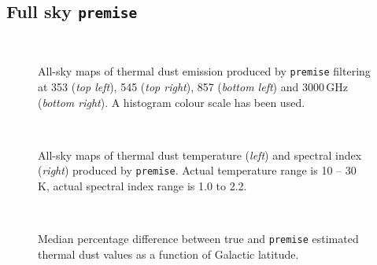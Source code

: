 \documentclass[a4paper,fleqn,usenatbib]{mnras}
\begin{document}
\subsection{Full sky {\texttt{premise}}}

\begin{figure}
\centering
{}
\,
\,
\caption{All-sky maps of thermal dust emission produced by {\texttt{premise}} filtering at 353 ({\it{top left}}), 545 ({\it{top right}}), 857 ({\it{bottom left}}) and 3000\,GHz ({\it{bottom right}}). A histogram colour scale has been used.}
\label{fig:dustmaps}
\end{figure}

\begin{figure}
\centering
{}
\,
\caption{All-sky maps of thermal dust temperature ({\it{left}}) and spectral index ({\it{right}}) produced by {\texttt{premise}}. Actual temperature range is 10 -- 30 K, actual spectral index range is 1.0 to 2.2.}
\label{fig:paramsmaps}
\end{figure}

\begin{figure}
\centering
{}\,
\,
\caption{Median percentage difference between true and {\texttt{premise}} estimated thermal dust values as a function of Galactic latitude.}
\label{fig:lats}
\end{figure}
\end{document}
